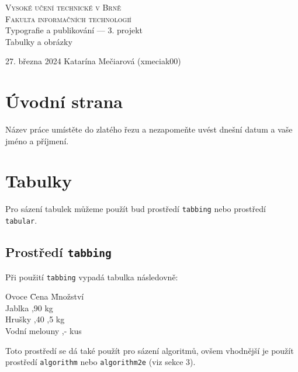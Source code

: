\documentclass[11pt]{article}
\begin{document}
    \begin{titlepage}
        \begin{center}
            \Huge\textsc{Vysoké učení technické v Brně}\\
            \huge\textsc{Fakulta informačních technologií}\\
            {Typografie a publikování –– 3. projekt}\\
            \Huge{Tabulky a obrázky}\\
        \end{center}
        {\LARGE 27. března 2024 \hfill
        Katarína Mečiarová (xmeciak00)}

    \end{titlepage}

    \section{Úvodní strana}
        Název práce umístěte do zlatého řezu a nezapomeňte uvést dnešní datum a vaše jméno a příjmení.

    \section{Tabulky}
        Pro sázení tabulek můžeme použít bud prostředí \verb|tabbing| nebo prostředí \verb|tabular|.

        \subsection{Prostředí \texttt{tabbing}}
            Při použití \verb|tabbing| vypadá tabulka následovně:
            \begin{tabbing}
                    Ovoce           \= Cena     \= Množství     \\
                    Jablka          ,90     kg         \\
                    Hrušky          ,40    ,5 kg       \\
                    Vodní melouny   ,-      kus        \\
            \end{tabbing}
            Toto prostředí se dá také použít pro sázení algoritmů, ovšem vhodnější je použít prostředí \verb|algorithm| nebo \verb|algorithm2e| (viz sekce 3).
\end{document}
